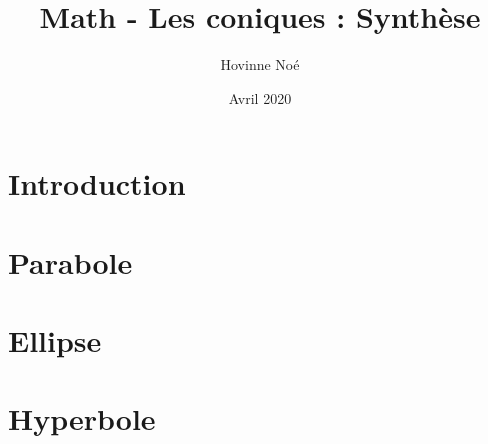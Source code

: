 \documentclass[12pt]{article}
\begin{document}
\title{\textbf{Math - Les coniques : Synthèse}}
\author{Hovinne Noé}
\date{Avril 2020}
\maketitle
\tableofcontents

\newpage
\section{Introduction}
\section{Parabole}
\section{Ellipse}
\section{Hyperbole}
\end{document}
